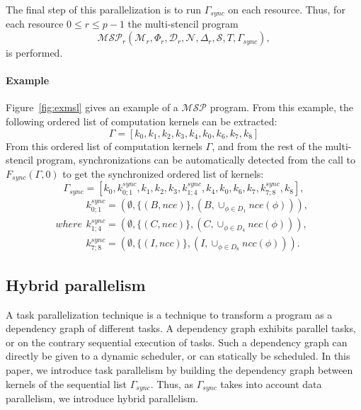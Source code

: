  The final step of this parallelization is to run $\Gamma_{sync}$ on each resource. Thus, for each resource $0 \leq r \leq p-1$ the multi-stencil program 
\begin{equation}
\mathcal{MSP}_r(\mathcal{M}_r,\Phi_r,\mathcal{D}_r,\mathcal{N},\Delta_r,\mathcal{S},T,\Gamma_{sync}),
\end{equation}
is performed.

\paragraph{\textbf{Example}} Figure~\ref{fig:exmsl} gives an example of a $\mathcal{MSP}$ program. From this example, the following ordered list of computation kernels can be extracted:
\begin{equation*}
\Gamma = [k_0,k_1,k_2,k_3,k_4,k_0,k_6,k_7,k_8]
\end{equation*}
From this ordered list of computation kernels $\Gamma$, and from the rest of the multi-stencil program, synchronizations can be automatically detected from the call to $F_{sync}(\Gamma,0)$ to get the synchronized ordered list of kernels:
\begin{equation}
\Gamma_{sync} = [k_0,k_{0;1}^{sync},k_1,k_2,k_3,k_{1;4}^{sync},k_4,k_0,k_6,k_7,k_{7;8}^{sync},k_8],
\label{eq:exsync}
\end{equation}
\begin{subequations}
where
\begin{align}
        k_{0;1}^{sync}=(\emptyset,\{(B,nce)\},(B,\cup_{\phi \in D_1} nce(\phi))),\\
        k_{1;4}^{sync}=(\emptyset,\{(C,nec)\},(C,\cup_{\phi \in D_4} nec(\phi))),\\
        k_{7;8}^{sync}=(\emptyset,\{(I,ncc)\},(I,\cup_{\phi \in D_8} ncc(\phi))).
\end{align}
\end{subequations}

\subsection{Hybrid parallelism}
A task parallelization technique is a technique to transform a program as a dependency graph of different tasks. A dependency graph exhibits parallel tasks, or on the contrary sequential execution of tasks. Such a dependency graph can directly be given to a dynamic scheduler, or can statically be scheduled. In this paper, we introduce task parallelism by building the dependency graph between kernels of the sequential list $\Gamma_{sync}$. Thus, as $\Gamma_{sync}$ takes into account data parallelism, we introduce hybrid parallelism.

